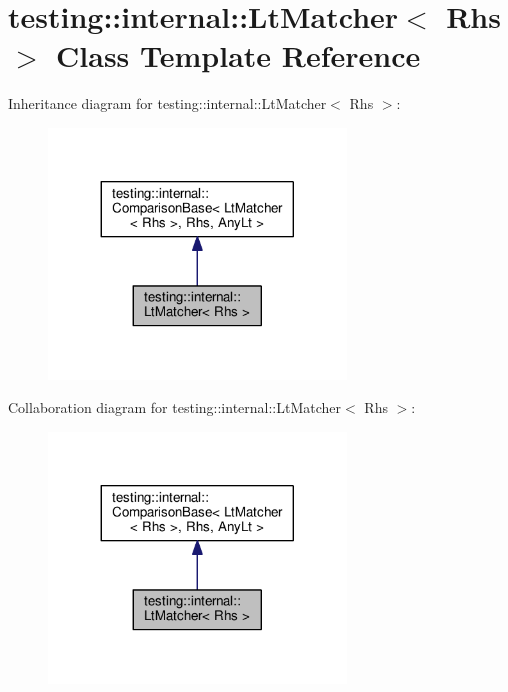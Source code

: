 \hypertarget{classtesting_1_1internal_1_1LtMatcher}{}\section{testing\+:\+:internal\+:\+:Lt\+Matcher$<$ Rhs $>$ Class Template Reference}
\label{classtesting_1_1internal_1_1LtMatcher}


Inheritance diagram for testing\+:\+:internal\+:\+:Lt\+Matcher$<$ Rhs $>$\+:\nopagebreak
\begin{figure}[H]
\begin{center}
\leavevmode
\includegraphics[width=224pt]{classtesting_1_1internal_1_1LtMatcher__inherit__graph}
\end{center}
\end{figure}


Collaboration diagram for testing\+:\+:internal\+:\+:Lt\+Matcher$<$ Rhs $>$\+:\nopagebreak
\begin{figure}[H]
\begin{center}
\leavevmode
\includegraphics[width=224pt]{classtesting_1_1internal_1_1LtMatcher__coll__graph}
\end{center}
\end{figure}
